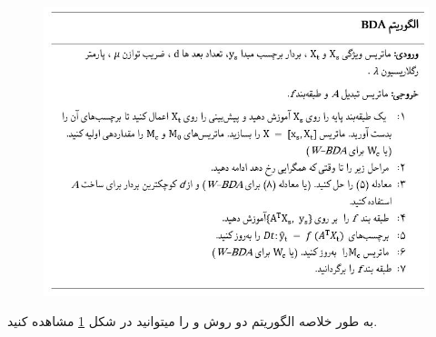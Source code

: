 {{{	 		\begin{figure}
	 			\centering
	 			\includegraphics[scale=0.5]{images/table1.jpg}
	 			\caption{}
	 			\label{fig:5}
	 		\end{figure}
	 	
	 	به طور خلاصه الگوریتم دو روش 
	 	و
	 	را میتوانید در شکل
	 	\ref{fig:5}
	 	 مشاهده کنید.
	 		
	 	}
	}

}
